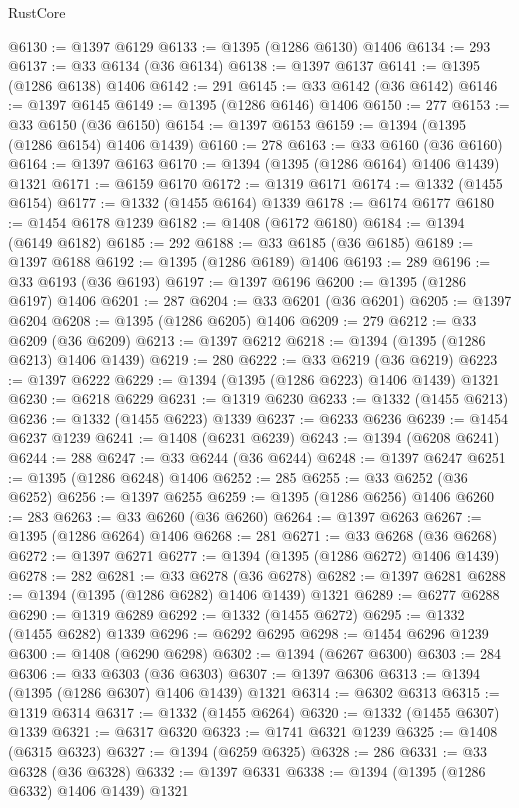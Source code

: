 \begin{lexlean}{RustCore}
\begin{coremodule}
@6130 := @1397 @6129
@6133 := @1395 (@1286 @6130) @1406
@6134 := 293
@6137 := @33 @6134 (@36 @6134)
@6138 := @1397 @6137
@6141 := @1395 (@1286 @6138) @1406
@6142 := 291
@6145 := @33 @6142 (@36 @6142)
@6146 := @1397 @6145
@6149 := @1395 (@1286 @6146) @1406
@6150 := 277
@6153 := @33 @6150 (@36 @6150)
@6154 := @1397 @6153
@6159 := @1394 (@1395 (@1286 @6154) @1406 @1439)
@6160 := 278
@6163 := @33 @6160 (@36 @6160)
@6164 := @1397 @6163
@6170 := @1394 (@1395 (@1286 @6164) @1406 @1439) @1321
@6171 := @6159 @6170
@6172 := @1319 @6171
@6174 := @1332 (@1455 @6154)
@6177 := @1332 (@1455 @6164) @1339
@6178 := @6174 @6177
@6180 := @1454 @6178 @1239
@6182 := @1408 (@6172 @6180)
@6184 := @1394 (@6149 @6182)
@6185 := 292
@6188 := @33 @6185 (@36 @6185)
@6189 := @1397 @6188
@6192 := @1395 (@1286 @6189) @1406
@6193 := 289
@6196 := @33 @6193 (@36 @6193)
@6197 := @1397 @6196
@6200 := @1395 (@1286 @6197) @1406
@6201 := 287
@6204 := @33 @6201 (@36 @6201)
@6205 := @1397 @6204
@6208 := @1395 (@1286 @6205) @1406
@6209 := 279
@6212 := @33 @6209 (@36 @6209)
@6213 := @1397 @6212
@6218 := @1394 (@1395 (@1286 @6213) @1406 @1439)
@6219 := 280
@6222 := @33 @6219 (@36 @6219)
@6223 := @1397 @6222
@6229 := @1394 (@1395 (@1286 @6223) @1406 @1439) @1321
@6230 := @6218 @6229
@6231 := @1319 @6230
@6233 := @1332 (@1455 @6213)
@6236 := @1332 (@1455 @6223) @1339
@6237 := @6233 @6236
@6239 := @1454 @6237 @1239
@6241 := @1408 (@6231 @6239)
@6243 := @1394 (@6208 @6241)
@6244 := 288
@6247 := @33 @6244 (@36 @6244)
@6248 := @1397 @6247
@6251 := @1395 (@1286 @6248) @1406
@6252 := 285
@6255 := @33 @6252 (@36 @6252)
@6256 := @1397 @6255
@6259 := @1395 (@1286 @6256) @1406
@6260 := 283
@6263 := @33 @6260 (@36 @6260)
@6264 := @1397 @6263
@6267 := @1395 (@1286 @6264) @1406
@6268 := 281
@6271 := @33 @6268 (@36 @6268)
@6272 := @1397 @6271
@6277 := @1394 (@1395 (@1286 @6272) @1406 @1439)
@6278 := 282
@6281 := @33 @6278 (@36 @6278)
@6282 := @1397 @6281
@6288 := @1394 (@1395 (@1286 @6282) @1406 @1439) @1321
@6289 := @6277 @6288
@6290 := @1319 @6289
@6292 := @1332 (@1455 @6272)
@6295 := @1332 (@1455 @6282) @1339
@6296 := @6292 @6295
@6298 := @1454 @6296 @1239
@6300 := @1408 (@6290 @6298)
@6302 := @1394 (@6267 @6300)
@6303 := 284
@6306 := @33 @6303 (@36 @6303)
@6307 := @1397 @6306
@6313 := @1394 (@1395 (@1286 @6307) @1406 @1439) @1321
@6314 := @6302 @6313
@6315 := @1319 @6314
@6317 := @1332 (@1455 @6264)
@6320 := @1332 (@1455 @6307) @1339
@6321 := @6317 @6320
@6323 := @1741 @6321 @1239
@6325 := @1408 (@6315 @6323)
@6327 := @1394 (@6259 @6325)
@6328 := 286
@6331 := @33 @6328 (@36 @6328)
@6332 := @1397 @6331
@6338 := @1394 (@1395 (@1286 @6332) @1406 @1439) @1321

\end{coremodule}
\end{lexlean}
